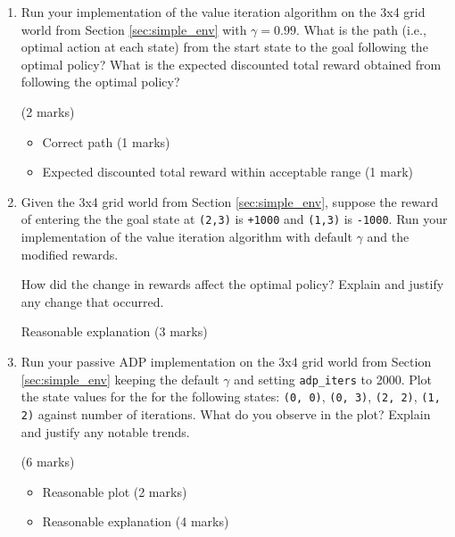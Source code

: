 \documentclass[12pt]{article}
\begin{document}
\begin{enumerate}
    \item Run your implementation of the value iteration algorithm on the 3x4 grid world from Section \ref{sec:simple_env} with $\gamma = 0.99$. What is the path (i.e., optimal action at each state) from the start state to the goal following the optimal policy? What is the expected discounted total reward obtained from following the optimal policy?    
    \begin{markscheme}
        (2 marks)
        \begin{itemize}
            \item Correct path (1 marks)
            \item Expected discounted total reward within acceptable range (1 mark)
        \end{itemize}
    \end{markscheme}

    \item Given the 3x4 grid world from Section \ref{sec:simple_env}, suppose the reward of entering the the goal state at \texttt{(2,3)} is \texttt{+1000} and \texttt{(1,3)} is \texttt{-1000}. Run your implementation of the value iteration algorithm with default $\gamma$ and the modified rewards.
 
    How did the change in rewards affect the optimal policy? Explain and justify any change that occurred.

    \begin{markscheme}
        Reasonable explanation (3 marks)
    \end{markscheme}

    \item Run your passive ADP implementation on the 3x4 grid world from Section \ref{sec:simple_env} keeping the default $\gamma$ and setting \texttt{adp\_iters} to 2000. Plot the state values for the for the following states: \texttt{(0, 0)}, \texttt{(0, 3)}, \texttt{(2, 2)}, \texttt{(1, 2)} against number of iterations. What do you observe in the plot? Explain and justify any notable trends.
    
    \begin{markscheme}
    (6  marks)
        \begin{itemize}
            \item Reasonable plot (2 marks)
            \item Reasonable explanation (4 marks)
        \end{itemize}
    \end{markscheme}


\end{enumerate}
\end{document}
